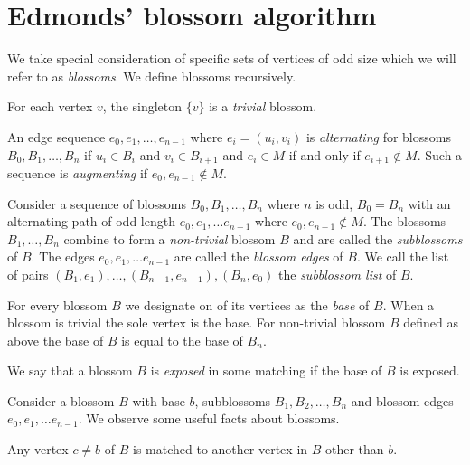 \section{Edmonds' blossom algorithm}

We take special consideration of specific sets of vertices of odd size which we will refer to as \textit{blossoms}. We define blossoms recursively.

\begin{defn}
    For each vertex $v$, the singleton $\{ v \}$ is a \emph{trivial} blossom.
\end{defn}

An edge sequence $e_0, e_1, \dots, e_{n-1}$ where $e_i=(u_i, v_i)$ is \emph{alternating} for blossoms $B_0, B_1, \dots, B_n$ if $u_i \in B_i$ and $v_i \in B_{i+1}$ and $e_i \in M$ if and only if $e_{i+1} \notin M$. Such a sequence is \textit{augmenting} if $e_0, e_{n-1} \notin M$.

\begin{defn}
    Consider a sequence of blossoms $B_0, B_1, \dots, B_n$ where $n$ is odd, $B_0 = B_n$ with an alternating path of odd length $e_0, e_1, \dots e_{n-1}$ where $e_0, e_{n - 1} \notin M$. The blossoms $B_1, \dots, B_n$ combine to form a \emph{non-trivial} blossom $B$ and are called the \emph{subblossoms} of $B$. The edges $e_0, e_1, \dots e_{n-1}$ are called the \emph{blossom edges} of $B$. We call the list of pairs $(B_1, e_1), \dots, (B_{n-1}, e_{n-1}), (B_n, e_0)$ the \emph{subblossom list} of $B$.
\end{defn}

\begin{defn}[base]
    For every blossom $B$ we designate on of its vertices as the \textit{base} of $B$. When a blossom is trivial the sole vertex is the base. For non-trivial blossom $B$ defined as above the base of $B$ is equal to the base of $B_n$.
\end{defn}

We say that a blossom $B$ is \emph{exposed} in some matching if the base of $B$ is exposed.

Consider a blossom $B$ with base $b$, subblossoms $B_1, B_2, \dots, B_n$ and blossom edges $e_0, e_1, \dots e_{n-1}$. We observe some useful facts about blossoms.

\begin{fact}\label{fact:blossom_mate}
    Any vertex $c \neq b$ of $B$ is matched to another vertex in $B$ other than $b$.
\end{fact}

